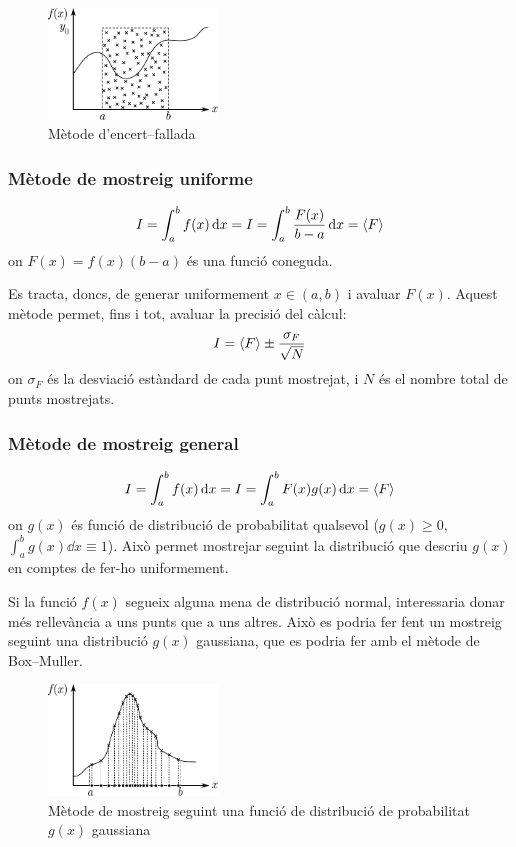 \begin{figure}[H]
	\centering
	\includegraphics[width=0.4\textwidth]{./images/encert-fallada}
	\caption{Mètode d'encert--fallada}
	\label{fig:encert-fallada}
\end{figure}

\subsubsection*{Mètode de mostreig uniforme}
\begin{align}
	I = \int_{a}^{b} f(x) \dd{x} = I = \int_{a}^{b} \frac{F(x)}{b-a} \dd{x} = \ev{F}
\end{align}
on $F(x) = f(x) (b-a)$ és una funció coneguda.

Es tracta, doncs, de generar uniformement $x \in (a,b)$ i avaluar $F(x)$. Aquest mètode permet, fins i tot, avaluar la precisió del càlcul:
\begin{align*}
	I = \ev{F} \pm \frac{\sigma_{F}}{\sqrt{N}}
\end{align*}
on $\sigma_{F}$ és la desviació estàndard de cada punt mostrejat, i $N$ és el nombre total de punts mostrejats.

\subsubsection*{Mètode de mostreig general}
\begin{align}
	I = \int_{a}^{b} f(x) \dd{x} = I = \int_{a}^{b} F(x) g(x) \dd{x} = \ev{F}
\end{align}
on $g(x)$ és funció de distribució de probabilitat qualsevol ($g(x) \geq 0$, $\int_{a}^{b} g(x) \dd{x} \equiv 1$). Això permet mostrejar seguint la distribució que descriu $g(x)$ en comptes de fer-ho uniformement.

\begin{example}
	Si la funció $f(x)$ segueix alguna mena de distribució normal, interessaria donar més rellevància a uns punts que a uns altres. Això es podria fer fent un mostreig seguint una distribució $g(x)$ gaussiana, que es podria fer amb el mètode de Box--Muller.
	\begin{figure}[H]
		\centering
		\includegraphics[width=0.4\textwidth]{./images/mostreig-gaussia}
		\caption{Mètode de mostreig seguint una funció de distribució de probabilitat $g(x)$ gaussiana}
		\label{fig:mostreig-gaussia}
	\end{figure}
\end{example}

